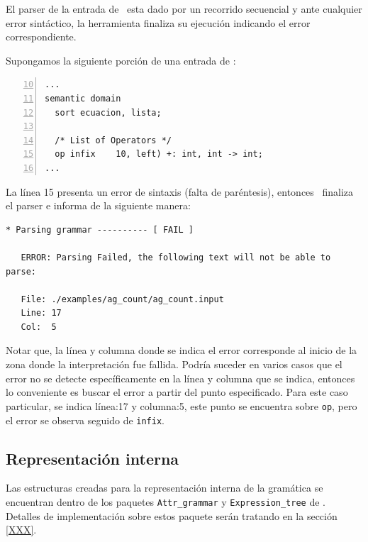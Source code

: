 El parser de la entrada de \maggen\ esta dado por un recorrido secuencial y ante cualquier error sintáctico, la herramienta finaliza su ejecución indicando el error correspondiente. 

Supongamos la siguiente porción de una entrada de \maggen:

\vspace{0.3cm}
\begin{lstlisting}[basicstyle=\footnotesize, numbers=left, firstnumber=10, numbers=left, language=specmag, linewidth=9cm, columns=fullflexible]
...
semantic domain
  sort ecuacion, lista;

  /* List of Operators */
  op infix    10, left) +: int, int -> int;
...
\end{lstlisting}
\vspace{0.3cm}

La línea 15 presenta un error de sintaxis (falta de paréntesis), entonces \maggen\ finaliza el parser e informa de la siguiente manera:

\vspace{0.3cm}
\begin{lstlisting}[backgroundcolor=\color{white}, basicstyle=\footnotesize]
   * Parsing grammar ---------- [ FAIL ]

   ERROR: Parsing Failed, the following text will not be able to parse:

   File: ./examples/ag_count/ag_count.input
   Line: 17
   Col:  5
\end{lstlisting}
\vspace{0.3cm}

Notar que, la línea y columna donde se indica el error corresponde al inicio de la zona donde la interpretación fue fallida. Podría suceder en varios casos que el error no se detecte específicamente en la línea y columna que se indica, entonces lo conveniente es buscar el error a partir del punto especificado. Para este caso particular, se indica línea:17 y columna:5, este punto se encuentra sobre \texttt{op}, pero el error se observa seguido de \texttt{infix}.

\subsection*{Representación interna}

Las estructuras creadas para la representación interna de la gramática se encuentran dentro de los paquetes \texttt{Attr\_grammar} y \texttt{Expression\_tree} de \maggen. Detalles de implementación sobre estos paquete serán tratando en la sección \ref{XXX}. 

